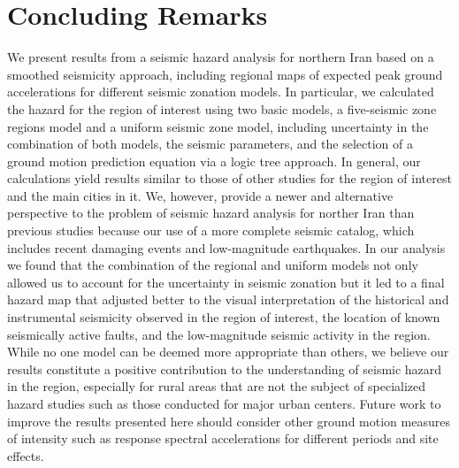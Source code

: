 
\section{Concluding Remarks}

We present results from a seismic hazard analysis for northern Iran based on a smoothed seismicity approach, including regional maps of expected peak ground accelerations for different seismic zonation models. In particular, we calculated the hazard for the region of interest using two basic models, a five-seismic zone regions model and a uniform seismic zone model, including uncertainty in the combination of both models, the seismic parameters, and the selection of a ground motion prediction equation via a logic tree approach. In general, our calculations yield results similar to those of other studies for the region of interest and the main cities in it. We, however, provide a newer and alternative perspective to the problem of seismic hazard analysis for norther Iran than previous studies because our use of a more complete seismic catalog, which includes recent damaging events and low-magnitude earthquakes. In our analysis we found that the combination of the regional and uniform models not only allowed us to account for the uncertainty in seismic zonation but it led to a final hazard map that adjusted better to the visual interpretation of the historical and instrumental seismicity observed in the region of interest, the location of known seismically active faults, and the low-magnitude seismic activity in the region. While no one model can be deemed more appropriate than others, we believe our results constitute a positive contribution to the understanding of seismic hazard in the region, especially for rural areas that are not the subject of specialized hazard studies such as those conducted for major urban centers. Future work to improve the results presented here should consider other ground motion measures of intensity such as response spectral accelerations for different periods and site effects.


